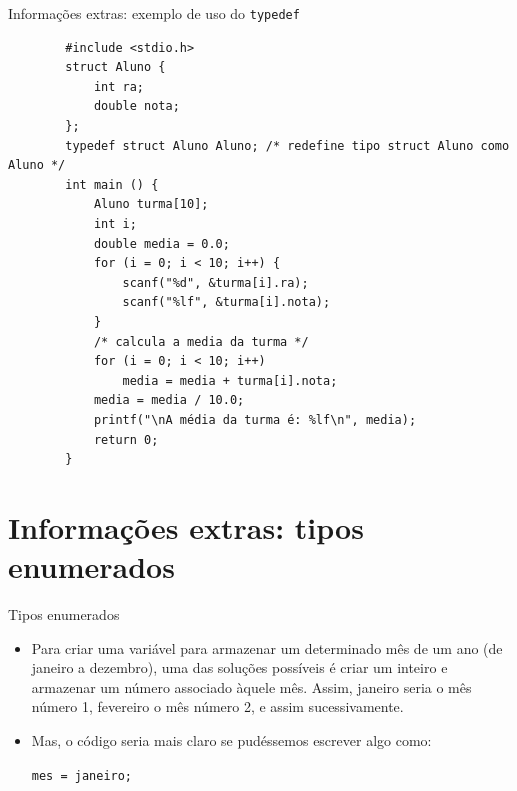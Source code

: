 \documentclass[handout]{beamer}
\newcommand{\cod}[1]{\texttt{#1}}
\begin{document}
\begin{frame}[fragile]{Informações extras: exemplo de uso do \texttt{typedef}}

    \vspace{-1em}
    \begin{verbatim}
        #include <stdio.h>
        struct Aluno {
            int ra;
            double nota;
        };
        typedef struct Aluno Aluno; /* redefine tipo struct Aluno como Aluno */
        int main () {
            Aluno turma[10];
            int i;
            double media = 0.0;
            for (i = 0; i < 10; i++) {
                scanf("%d", &turma[i].ra);
                scanf("%lf", &turma[i].nota);
            }
            /* calcula a media da turma */
            for (i = 0; i < 10; i++)
                media = media + turma[i].nota;
            media = media / 10.0;
            printf("\nA média da turma é: %lf\n", media);
            return 0;
        }
    \end{verbatim}

\end{frame}

\section{Informações extras: tipos enumerados}

\begin{frame}[fragile]{Tipos enumerados}

    \begin{itemize}
        \item Para criar uma variável para armazenar um determinado mês
        de um ano (de janeiro a dezembro), uma das soluções possíveis
        é criar um inteiro e armazenar um número associado àquele mês.
        Assim, janeiro seria o mês número 1, fevereiro o mês número 2,
        e assim sucessivamente.

        \item Mas, o código seria mais claro se pudéssemos escrever algo como:

        \begin{center}
            \alert{\cod{mes = janeiro;}}
        \end{center}
    \end{itemize}

\end{frame}
\end{document}
